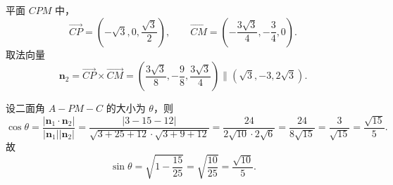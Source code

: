 \begin{answer}
平面 $CPM$ 中，
\nopagebreak[4]
\[\overrightarrow{CP}=\left(-\sqrt3,0,\frac{\sqrt3}2\right),\qquad
\overrightarrow{CM}=\left(-\frac{3\sqrt3}4,-\frac34,0\right).\]
取法向量
\nopagebreak[4]
\[\boldsymbol n_2=\overrightarrow{CP}\times\overrightarrow{CM}
=\left(\frac{3\sqrt3}8,-\frac98,\frac{3\sqrt3}4\right)\parallel(\sqrt3,-3,2\sqrt3).\]

设二面角 $A-PM-C$ 的大小为 $\theta$，则
\nopagebreak[4]
\[\cos\theta=\frac{|\boldsymbol n_1\cdot\boldsymbol n_2|}{|\boldsymbol n_1||\boldsymbol n_2|}
=\frac{|3-15-12|}{\sqrt{3+25+12}\cdot\sqrt{3+9+12}}
=\frac{24}{2\sqrt{10}\cdot2\sqrt6}
=\frac{24}{8\sqrt{15}}=\frac{3}{\sqrt{15}}=\frac{\sqrt{15}}5 .\]
故
\nopagebreak[4]
\[\sin\theta=\sqrt{1-\frac{15}{25}}=\sqrt{\frac{10}{25}}=\frac{\sqrt{10}}5 .\]



\end{answer}

